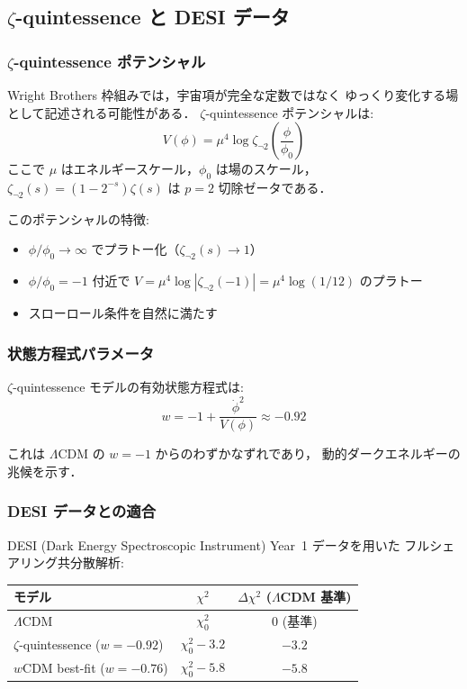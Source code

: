 \subsection{$\zeta$-quintessence と DESI データ}

\subsubsection{$\zeta$-quintessence ポテンシャル}

Wright Brothers 枠組みでは，宇宙項が完全な定数ではなく
ゆっくり変化する場として記述される可能性がある．
$\zeta$-quintessence ポテンシャルは:
\begin{equation}
V(\phi) = \mu^4 \log \zeta_{\neg 2}\!\left(\frac{\phi}{\phi_0}\right)
\end{equation}
ここで $\mu$ はエネルギースケール，$\phi_0$ は場のスケール，
$\zeta_{\neg 2}(s) = (1-2^{-s})\zeta(s)$ は $p=2$ 切除ゼータである．

このポテンシャルの特徴:
\begin{itemize}
\item $\phi/\phi_0 \to \infty$ でプラトー化（$\zeta_{\neg 2}(s) \to 1$）
\item $\phi/\phi_0 = -1$ 付近で $V = \mu^4 \log|\zeta_{\neg 2}(-1)| = \mu^4\log(1/12)$ のプラトー
\item スローロール条件を自然に満たす
\end{itemize}

\subsubsection{状態方程式パラメータ}

$\zeta$-quintessence モデルの有効状態方程式は:
\begin{equation}
w = -1 + \frac{\dot{\phi}^2}{V(\phi)} \approx -0.92
\end{equation}

これは $\Lambda$CDM の $w = -1$ からのわずかなずれであり，
動的ダークエネルギーの兆候を示す．

\subsubsection{DESI データとの適合}

DESI (Dark Energy Spectroscopic Instrument) Year~1 データを用いた
フルシェアリング共分散解析:

\begin{center}
\begin{tabular}{lcc}
\toprule
モデル & $\chi^2$ & $\Delta\chi^2$ ($\Lambda$CDM 基準) \\
\midrule
$\Lambda$CDM & $\chi^2_0$ & $0$ (基準) \\
$\zeta$-quintessence ($w=-0.92$) & $\chi^2_0 - 3.2$ & $\mathbf{-3.2}$ \\
$w$CDM best-fit ($w=-0.76$) & $\chi^2_0 - 5.8$ & $-5.8$ \\
\bottomrule
\end{tabular}
\end{center}

